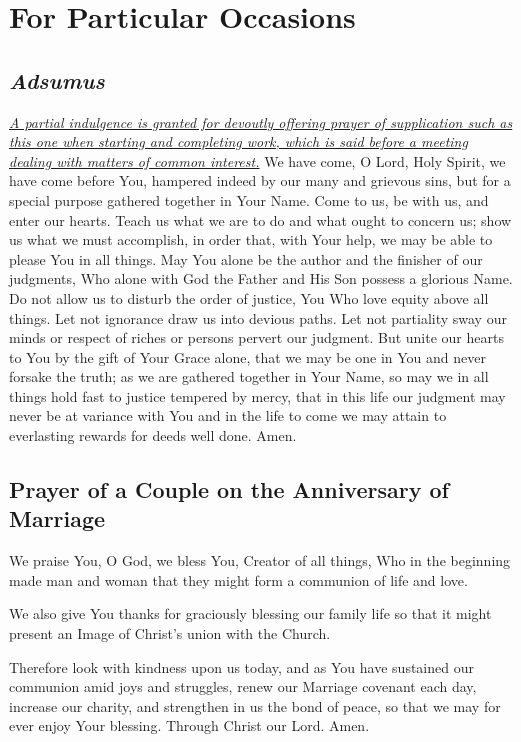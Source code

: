\documentclass[12pt]{article}
\newcommand{\prayersection}[1]{\section{#1}}
\newcommand{\prayertitle}[1]{\subsection{#1}}
\newcommand{\indulgencedprayertitle}[1]{\prayertitle{#1 \protect\kreuz}}
\newcommand{\emphasis}[1]{\emph{#1}}
\newcommand{\emphasis}[1]{\textsl{#1}}
\newcommand{\foreign}[1]{\emphasis{#1}}
\newcommand{\note}[1]{{\small{\emphasis{#1}}}\newline}
\newcommand{\linkednote}[2]{\hyperlink{#1}{\note{#2}}}
\begin{document}
\newpage


\prayersection{For Particular Occasions}
\indulgencedprayertitle{\foreign{Adsumus}}
\linkednote{grant26}{A partial indulgence is granted for devoutly offering prayer of supplication such as this one when starting and completing work, which is said before a meeting dealing with matters of common interest.}
We have come, O Lord, Holy Spirit, we have come before You, hampered indeed by our many and grievous sins, but for a special purpose gathered together in Your Name.
Come to us, be with us, and enter our hearts.
Teach us what we are to do and what ought to concern us;
show us what we must accomplish, in order that, with Your help, we may be able to please You in all things.
May You alone be the author and the finisher of our judgments, Who alone with God the Father and His Son possess a glorious Name.
Do not allow us to disturb the order of justice, You Who love equity above all things.
Let not ignorance draw us into devious paths.
Let not partiality sway our minds or respect of riches or persons pervert our judgment.
But unite our hearts to You by the gift of Your Grace alone, that we may be one in You and never forsake the truth;
as we are gathered together in Your Name, so may we in all things hold fast to justice tempered by mercy, that in this life our judgment may never be at variance with You and in the life to come we may attain to everlasting rewards for deeds well done.
Amen.

\prayertitle{Prayer of a Couple on the Anniversary of Marriage}
We praise You, O God, we bless You, Creator of all things, Who in the beginning made man and woman that they might form a communion of life and love.

We also give You thanks for graciously blessing our family life so that it might present an Image of Christ's union with the Church.

Therefore look with kindness upon us today, and as You have sustained our communion amid joys and struggles, renew our Marriage covenant each day, increase our charity, and strengthen in us the bond of peace, so that we may for ever enjoy Your blessing.
Through Christ our Lord. Amen.
\end{document}
